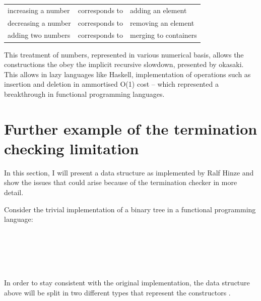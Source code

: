 \documentclass[12pt,twoside,notitlepage]{report}
\begin{document}
\vspace{5mm} %
\begin{tabular}{lcl}
increasing a number & corresponds to & adding an element\\
decreasing a number & corresponds to & removing an element \\
adding two numbers & corresponds to & merging to containers \\
\end{tabular} 
\vspace{5mm}

This treatment of numbers, represented in various numerical basis, allows the constructions the obey the implicit recursive slowdown, presented by okasaki. This allows in lazy languages like Haskell, implementation of operations such as insertion and deletion in ammortised O(1) cost -- which represented a breakthrough in functional programming languages.

\section{Further example of the termination checking limitation}
\label{app:termcheck}
In this section, I will present a data structure as implemented by Ralf Hinze\cite{nestedhinze} and show the issues that could arise because of the termination checker in more detail. 

Consider the trivial implementation of a binary tree in a functional programming language:

\begin{code}
\\
\>[2]\<[4]%
\>[4]  \AgdaSymbol{(} \AgdaSymbol{:} \AgdaSymbol{)} \AgdaSymbol{:}  \<%
\\
\>[4]\<[6]%
\>[6] \AgdaSymbol{:}    \<%
\\
\>[4]\<[6]%
\>[6] \AgdaSymbol{:}        \<%
\\
\end{code}

In order to stay consistent with the original implementation, the data structure above will be split in two different types that represent the constructors \cite{numerical}.
\end{document}

